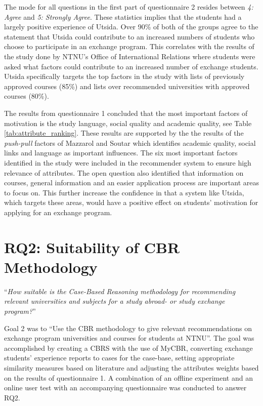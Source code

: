 The mode for all questions in the first part of questionnaire 2 resides between \textit{4: Agree} and \textit{5: Strongly Agree}. These statistics implies that the students had a largely positive experience of Utsida. Over 90\% of both of the groups agree to the statement that Utsida could contribute to an increased numbers of students who choose to participate in an exchange program. This correlates with the results of the study done by NTNU's Office of International Relations where students were asked what factors could contribute to an increased number of exchange students. Utsida specifically targets the top factors in the study with lists of previously approved courses (85\%) and lists over recommended universities with approved courses (80\%).


The results from questionnaire 1 concluded that the most important factors of motivation is the study language, social quality and academic quality, see Table \ref{tab:attribute_ranking}. These results are supported by the the results of the \emph{push-pull} factors of Mazzarol and Soutar \cite{mazzarol2002push} which identifies academic quality, social links and language as important influences. The six most important factors identified in the study were included in the recommender system to ensure high relevance of attributes. The open question also identified that information on courses, general information and an easier application process are important areas to focus on. This further increase the confidence in that a system like Utsida, which targets these areas, would have a positive effect on students' motivation for applying for an exchange program.

\section{RQ2: Suitability of CBR Methodology}

\enquote{\textit{How suitable is the Case-Based Reasoning methodology for recommending relevant universities and subjects for a study abroad- or study exchange program?}}

Goal 2 was to \enquote{Use the CBR methodology to give relevant recommendations on exchange program universities and courses for students at NTNU}. The goal was accomplished by creating a CBRS with the use of MyCBR, converting exchange students' experience reports to cases for the case-base, setting appropriate similarity measures based on literature and adjusting the attributes weights based on the results of questionnaire 1. A combination of an offline experiment and an online user test with an accompanying questionnaire was conducted to answer RQ2. 

